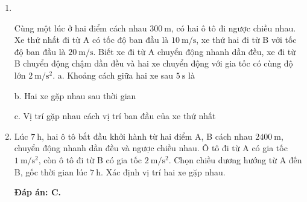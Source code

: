 \begin{enumerate}[label=\bfseries Câu \arabic*:]
\item {}\\
{Cùng một lúc ở hai điểm cách nhau $\SI{300}{\meter}$, có hai ô tô đi ngược chiều nhau. Xe thứ nhất đi từ A có tốc độ ban đầu là $\SI{10}{\meter/\second}$, xe thứ hai đi từ B với tốc độ ban đầu là $\SI{20}{\meter/\second}$. Biết xe đi từ A chuyển động nhanh dần đều, xe đi từ B chuyển động chậm dần đều và hai xe chuyển động với gia tốc có cùng độ lớn $\SI{2}{\meter/\second^2}$.
	a. Khoảng cách giữa hai xe sau $\SI{5}{\second}$ là 
	\begin{mcq}(4)
		\item $\SI{100}{\meter}$.
		\item $\SI{150}{\meter}$.
		\item $\SI{200}{\meter}$.
		\item $\SI{400}{\meter}$.
	\end{mcq}
b. Hai xe gặp nhau sau thời gian
c. Vị trí gặp nhau cách vị trí ban đầu của xe thứ nhất
}



	\item {}
	
	{Lúc $\SI{7}{\hour}$, hai ô tô bắt đầu khởi hành từ hai điểm A, B cách nhau $\SI{2400}{\meter}$, chuyển động nhanh dần đều và ngược chiều nhau. Ô tô đi từ A có gia tốc $\SI{1}{\meter / \second \squared}$, còn ô tô đi từ B có gia tốc $\SI{2}{\meter / \second \squared}$. Chọn chiều dương hướng từ A đến B, gốc thời gian lúc $\SI{7}{\hour}$. Xác định vị trí hai xe gặp nhau.
	}
	\hideall
	{	\textbf{Đáp án: C.}
		
}
\end{enumerate}

